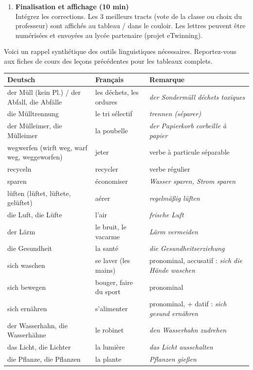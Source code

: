 \documentclass[11pt]{article}
\newcounter{popsec}
\newcounter{popsub}
\newcommand{\courssub}[1]{%
  \stepcounter{popsub}%
  \par\vspace{9pt}\noindent{\popxbold\fontsize{11.5}{13}\selectfont\color{popink}{\color{poporange}\thepopsec.\thepopsub}\hspace{6pt}#1}\par\nopagebreak\vspace{4pt}
}
\newcommand{\all}[1]{\ifmmode\text{\textit{#1}}\else\begingroup\selectlanguage{ngerman}\itshape #1\endgroup\fi}
\begin{document}
\begin{enumerate}
    \item \textbf{Finalisation et affichage (10 min)} \\
    Intégrez les corrections. Les 3 meilleurs tracts (vote de la classe ou choix du professeur) sont affichés au tableau / dans le couloir. Les lettres peuvent être numérisées et envoyées au lycée partenaire (projet eTwinning).
\end{enumerate}

\courssub{Ressources à mobiliser}
Voici un rappel synthétique des outils linguistiques nécessaires. Reportez-vous aux fiches de cours des leçons précédentes pour les tableaux complets.

\begin{definition}
\begin{center}
\begin{tabular}{|l|l|l|}
\hline
\rowcolor{popblueL} \textbf{Deutsch} & \textbf{Français} & \textbf{Remarque} \\
\hline
der Müll (kein Pl.) / der Abfall, die Abfälle & les déchets, les ordures & \all{der Sondermüll} déchets toxiques \\
die Mülltrennung & le tri sélectif & \all{trennen} (séparer) \\
der Mülleimer, die Mülleimer & la poubelle & \all{der Papierkorb} corbeille à papier \\
wegwerfen (wirft weg, warf weg, weggeworfen) & jeter & verbe à particule séparable \\
recyceln & recycler & verbe régulier \\
sparen & économiser & \all{Wasser sparen}, \all{Strom sparen} \\
lüften (lüftet, lüftete, gelüftet) & aérer & \all{regelmäßig lüften} \\
die Luft, die Lüfte & l'air & \all{frische Luft} \\
der Lärm & le bruit, le vacarme & \all{Lärm vermeiden} \\
die Gesundheit & la santé & \all{die Gesundheitserziehung} \\
sich waschen & se laver (les mains) & pronominal, accusatif : \all{sich die Hände waschen} \\
sich bewegen & bouger, faire du sport & pronominal \\
sich ernähren & s'alimenter & pronominal, + datif : \all{sich gesund ernähren} \\
der Wasserhahn, die Wasserhähne & le robinet & \all{den Wasserhahn zudrehen} \\
das Licht, die Lichter & la lumière & \all{das Licht ausschalten} \\
die Pflanze, die Pflanzen & la plante & \all{Pflanzen gießen} \\
\hline
\end{tabular}
\end{center}
\end{definition}
\end{document}
